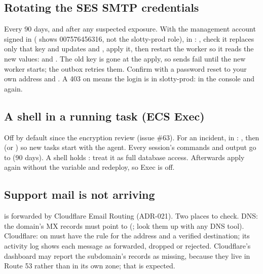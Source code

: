 \subsection{Rotating the SES SMTP credentials}
Every 90 days, and after any suspected exposure. With the management account signed in
( shows 007576456316, not the slotty-prod role), in
: , check it
replaces only that key and updates  and ,
apply it, then restart the worker so it reads the new values:
 and . The old key is gone at the
apply, so sends fail until the new worker starts; the outbox retries them. Confirm with a password
reset to your own address and . A 403 on  means the login
is in slotty-prod:  in the console and  again.

\subsection{A shell in a running task (ECS Exec)}
Off by default since the encryption review (issue \#63). For an incident, in :
, then  (or ) so new tasks
start with the agent. Every session's commands and output go to  (90 days). A
shell holds : treat it as full database access. Afterwards apply again
without the variable and redeploy, so Exec is off.

\subsection{Support mail is not arriving}
 is forwarded by Cloudflare Email Routing (ADR-021). Two
places to check. DNS: the domain's MX records must point to 
(; look them up with any DNS tool). Cloudflare: 
\textrightarrow{}  on  must have the rule for the
address and a verified destination; its activity log shows each message as forwarded, dropped or
rejected. Cloudflare's dashboard may report the subdomain's records as missing, because they live
in Route 53 rather than in its own zone; that is expected.

